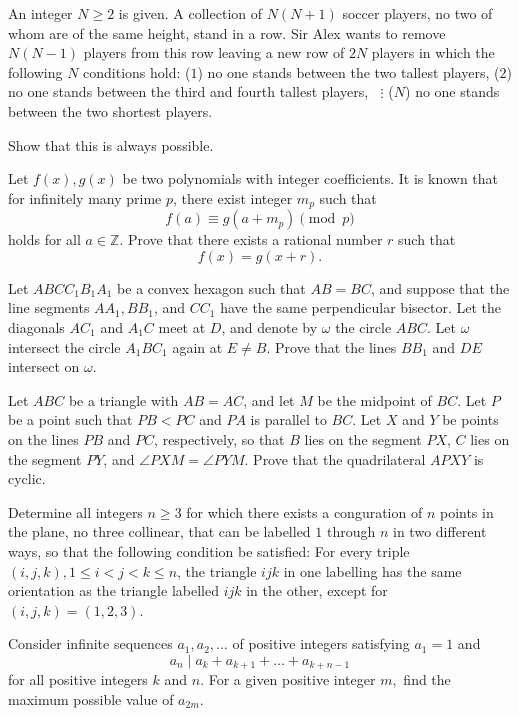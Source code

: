 \documentclass[11pt]{scrartcl}
\begin{document}
\begin{problem}[874415503743541]
	An integer $N \ge 2$ is given. A collection of $N(N + 1)$ soccer players, no two of whom are of the same height, stand in a row. Sir Alex wants to remove $N(N - 1)$ players from this row leaving a new row of $2N$ players in which the following $N$ conditions hold:
($1$) no one stands between the two tallest players,
($2$) no one stands between the third and fourth tallest players,
$\;\;\vdots$
($N$) no one stands between the two shortest players.

Show that this is always possible.
\end{problem}
\begin{problem}[875593886862181]
	Let $f(x),g(x)$ be two polynomials with integer coefficients. It is known that for infinitely many prime $p$, there exist integer $m_p$ such that
$$f(a) \equiv g(a+m_p) \pmod p$$holds for all $a \in \mathbb{Z}.$ Prove that there exists a rational number $r$ such that
$$f(x)=g(x+r).$$
\end{problem}
\begin{problem}[876239022447910]
	Let $ABCC_1B_1A_1$ be a convex hexagon such that $AB=BC$, and suppose that the line segments $AA_1, BB_1$, and $CC_1$ have the same perpendicular bisector. Let the diagonals $AC_1$ and $A_1C$ meet at $D$, and denote by $\omega$ the circle $ABC$. Let $\omega$ intersect the circle $A_1BC_1$ again at $E \neq B$. Prove that the lines $BB_1$ and $DE$ intersect on $\omega$.
\end{problem}
\begin{problem}[883811987981100]
Let $ABC$ be a triangle with $AB=AC$, and let $M$ be the midpoint of $BC$. Let $P$ be a point such that $PB<PC$ and $PA$ is parallel to $BC$. Let $X$ and $Y$ be points on the lines $PB$ and $PC$, respectively, so that $B$ lies on the segment $PX$, $C$ lies on the segment $PY$, and $\angle PXM=\angle PYM$. Prove that the quadrilateral $APXY$ is cyclic.
\end{problem}
\begin{problem}[887161908366621]
Determine all integers $n \geq 3$ for which there exists a conguration of $n$ points in the plane, no three collinear, that can be labelled $1$ through $n$ in two different ways, so that the following
condition be satisfied: For every triple $(i,j,k), 1 \leq i < j < k \leq n$, the triangle $ijk$ in one labelling has the same orientation as the triangle labelled $ijk$ in the other, except for $(i,j,k) = (1,2,3)$.
\end{problem}
\begin{problem}[888114441475156]
Consider infinite sequences $a_1,a_2,\dots$ of positive integers satisfying $a_1=1$ and$$a_n \mid a_k+a_{k+1}+\dots+a_{k+n-1}$$for all positive integers $k$ and $n.$ For a given positive integer $m,$ find the maximum possible value of $a_{2m}.$
\end{problem}
\end{document}
